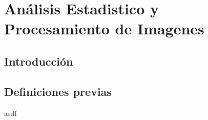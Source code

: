\chapter{Análisis Estadistico y Procesamiento de Imagenes }\label{chap2}

\section{Introducci\'on}


\section{Definiciones previas}

asdf